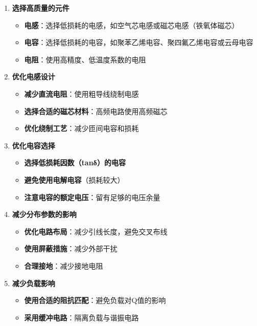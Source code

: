\documentclass[12pt,UTF8]{ctexbook}
\begin{document}
\begin{enumerate}[leftmargin=3.5em]
    \item \textbf{选择高质量的元件}
    \begin{itemize}
        \item \textbf{电感}：选择低损耗的电感，如空气芯电感或磁芯电感（铁氧体磁芯）
        \item \textbf{电容}：选择低损耗的电容，如聚苯乙烯电容、聚四氟乙烯电容或云母电容
        \item \textbf{电阻}：使用高精度、低温度系数的电阻
    \end{itemize}
    
    \item \textbf{优化电感设计}
    \begin{itemize}
        \item \textbf{减少直流电阻}：使用粗导线绕制电感
        \item \textbf{选择合适的磁芯材料}：高频电路使用高频磁芯
        \item \textbf{优化绕制工艺}：减少匝间电容和损耗
    \end{itemize}
    
    \item \textbf{优化电容选择}
    \begin{itemize}
        \item \textbf{选择低损耗因数（tanδ）的电容}
        \item \textbf{避免使用电解电容}（损耗较大）
        \item \textbf{注意电容的额定电压}：留有足够的电压余量
    \end{itemize}
    
    \item \textbf{减少分布参数的影响}
    \begin{itemize}
        \item \textbf{优化电路布局}：减少引线长度，避免交叉布线
        \item \textbf{使用屏蔽措施}：减少外部干扰
        \item \textbf{合理接地}：减少接地电阻
    \end{itemize}
    
    \item \textbf{减少负载影响}
    \begin{itemize}
        \item \textbf{使用合适的阻抗匹配}：避免负载对Q值的影响
        \item \textbf{采用缓冲电路}：隔离负载与谐振电路
    \end{itemize}
    

\end{enumerate}
\end{document}
